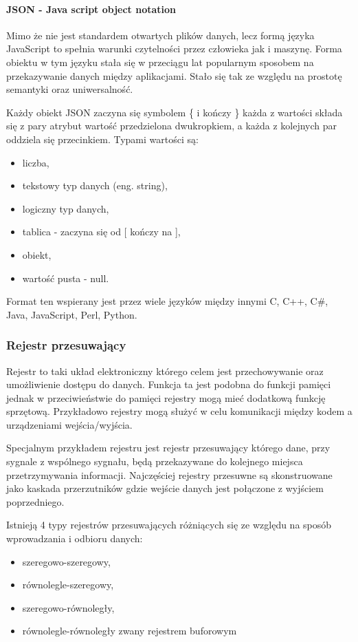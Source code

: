 \documentclass[a4paper,12pt]{article}
\begin{document}
\paragraph{JSON -  Java script object notation}

Mimo że nie jest standardem otwartych plików danych, lecz formą języka JavaScript to spełnia warunki czytelności przez człowieka jak i maszynę. 
Forma obiektu w tym języku stała się w przeciągu lat popularnym sposobem na przekazywanie danych między aplikacjami. Stało się tak ze względu na prostotę semantyki oraz uniwersalność. 

Każdy obiekt JSON zaczyna się symbolem \{ i kończy \} każda z wartości składa się z pary atrybut wartość przedzielona dwukropkiem, a każda z kolejnych par oddziela się przecinkiem. Typami wartości są:
\begin{itemize}
        \item liczba, 
        \item tekstowy typ danych (eng. string),
        \item logiczny typ danych,
        \item tablica - zaczyna się od [ kończy na ],
        \item obiekt,
        \item wartość pusta - null. 
\end{itemize}

Format ten wspierany jest przez wiele języków między innymi C, C++, C\#, Java, JavaScript, Perl, Python\cite{json}.

\subsubsection{Rejestr przesuwający}
Rejestr to taki układ elektroniczny którego celem jest przechowywanie oraz umożliwienie dostępu do danych. Funkcja ta jest podobna do funkcji pamięci jednak w przeciwieństwie do pamięci rejestry mogą mieć dodatkową funkcję sprzętową.
Przykładowo rejestry mogą służyć w celu komunikacji między kodem a urządzeniami wejścia/wyjścia.

Specjalnym przykładem rejestru jest rejestr przesuwający którego dane, przy sygnale z wspólnego sygnału, będą przekazywane do kolejnego miejsca przetrzymywania informacji. 
Najczęściej rejestry przesuwne są skonstruowane jako kaskada przerzutników gdzie wejście danych jest połączone z wyjściem poprzedniego.

Istnieją 4 typy rejestrów przesuwających różniących się ze względu na sposób wprowadzania i odbioru danych:
\begin{itemize}
        \item szeregowo-szeregowy,
        \item równolegle-szeregowy,
        \item szeregowo-równoległy,
        \item równolegle-równoległy zwany rejestrem buforowym  
\end{itemize} 
\end{document}
